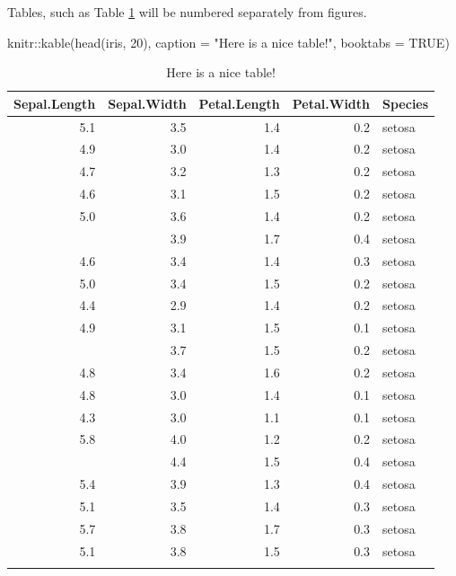 \documentclass[
]{article}
\newenvironment{Shaded}{\begin{snugshade}}{\end{snugshade}}
\newcommand{\AttributeTok}[1]{\textcolor[rgb]{0.77,0.63,0.00}{#1}}
\newcommand{\ConstantTok}[1]{\textcolor[rgb]{0.00,0.00,0.00}{#1}}
\newcommand{\DecValTok}[1]{\textcolor[rgb]{0.00,0.00,0.81}{#1}}
\newcommand{\FunctionTok}[1]{\textcolor[rgb]{0.00,0.00,0.00}{#1}}
\newcommand{\NormalTok}[1]{#1}
\newcommand{\SpecialCharTok}[1]{\textcolor[rgb]{0.00,0.00,0.00}{#1}}
\newcommand{\StringTok}[1]{\textcolor[rgb]{0.31,0.60,0.02}{#1}}
\begin{document}
Tables, such as Table \ref{tab:test-tab} will be numbered separately from figures.

\begin{Shaded}
\begin{Highlighting}[]
\NormalTok{knitr}\SpecialCharTok{::}\FunctionTok{kable}\NormalTok{(}\FunctionTok{head}\NormalTok{(iris, }\DecValTok{20}\NormalTok{), }\AttributeTok{caption =} \StringTok{"Here is a nice table!"}\NormalTok{, }\AttributeTok{booktabs =} \ConstantTok{TRUE}\NormalTok{)}
\end{Highlighting}
\end{Shaded}

\begin{table}

\caption{\label{tab:test-tab}Here is a nice table!}
\centering
\begin{tabular}[t]{rrrrl}
\toprule{}
Sepal.Length & Sepal.Width & Petal.Length & Petal.Width & Species\\
\midrule{}
5.1 & 3.5 & 1.4 & 0.2 & setosa\\
4.9 & 3.0 & 1.4 & 0.2 & setosa\\
4.7 & 3.2 & 1.3 & 0.2 & setosa\\
4.6 & 3.1 & 1.5 & 0.2 & setosa\\
5.0 & 3.6 & 1.4 & 0.2 & setosa\\
\addlinespace
5.4 & 3.9 & 1.7 & 0.4 & setosa\\
4.6 & 3.4 & 1.4 & 0.3 & setosa\\
5.0 & 3.4 & 1.5 & 0.2 & setosa\\
4.4 & 2.9 & 1.4 & 0.2 & setosa\\
4.9 & 3.1 & 1.5 & 0.1 & setosa\\
\addlinespace
5.4 & 3.7 & 1.5 & 0.2 & setosa\\
4.8 & 3.4 & 1.6 & 0.2 & setosa\\
4.8 & 3.0 & 1.4 & 0.1 & setosa\\
4.3 & 3.0 & 1.1 & 0.1 & setosa\\
5.8 & 4.0 & 1.2 & 0.2 & setosa\\
\addlinespace
5.7 & 4.4 & 1.5 & 0.4 & setosa\\
5.4 & 3.9 & 1.3 & 0.4 & setosa\\
5.1 & 3.5 & 1.4 & 0.3 & setosa\\
5.7 & 3.8 & 1.7 & 0.3 & setosa\\
5.1 & 3.8 & 1.5 & 0.3 & setosa\\
\bottomrule{}
\end{tabular}
\end{table}
\end{document}
